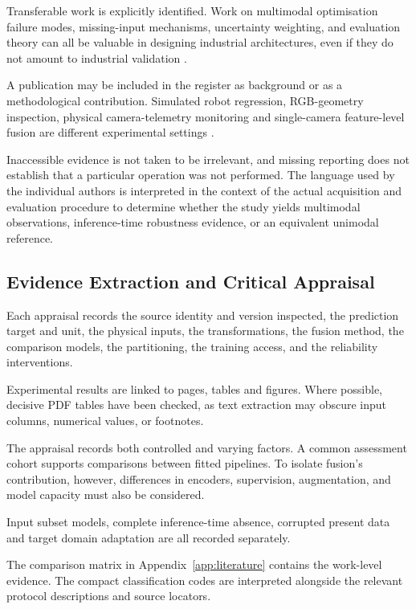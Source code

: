 Transferable work is explicitly identified. Work on multimodal optimisation failure modes,
missing-input mechanisms, uncertainty weighting, and evaluation theory can all be valuable in
designing industrial architectures, even if they do not amount to industrial validation
\parencite{Wang2020What,P016,P023,Bengio2004CVVariance}.

A publication may be included in the register as background or as a methodological contribution.
Simulated robot regression, RGB-geometry inspection, physical camera-telemetry monitoring and
single-camera feature-level fusion are different experimental settings
\parencite{Altinses2023Fuzzy,P026,Thoduka2024Handover,P035}.

Inaccessible evidence is not taken to be irrelevant, and missing reporting does not establish that a
particular operation was not performed. The language used by the individual authors is interpreted
in the context of the actual acquisition and evaluation procedure to determine whether the study
yields multimodal observations, inference-time robustness evidence, or an equivalent unimodal
reference.

\subsection{Evidence Extraction and Critical Appraisal}

Each appraisal records the source identity and version inspected, the prediction target and unit,
the physical inputs, the transformations, the fusion method, the comparison models, the
partitioning, the training access, and the reliability interventions.

Experimental results are linked to pages, tables and figures. Where possible, decisive PDF tables
have been checked, as text extraction may obscure input columns, numerical values, or footnotes.

The appraisal records both controlled and varying factors. A common assessment cohort supports
comparisons between fitted pipelines. To isolate fusion's contribution, however, differences in
encoders, supervision, augmentation, and model capacity must also be considered.

Input subset models, complete inference-time absence, corrupted present data and target domain
adaptation are all recorded separately.

The comparison matrix in Appendix~\ref{app:literature} contains the work-level evidence. The compact
classification codes are interpreted alongside the relevant protocol descriptions and source
locators.

